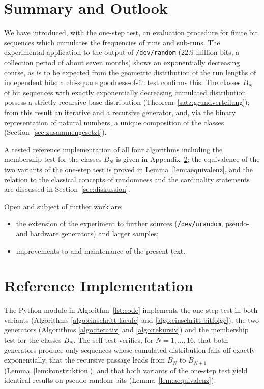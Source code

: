\documentclass[11pt,a4paper]{scrartcl}
\theoremstyle{plain}
\theoremstyle{definition}
\theoremstyle{remark}
\begin{document}
\section{Summary and Outlook}\label{sec:schluss}

We have introduced, with the one-step test, an evaluation procedure
for finite bit sequences which cumulates the frequencies of runs and
sub-runs. The experimental application to the output of
\texttt{/dev/random} ($22.9$ million bits, a collection period of
about seven months) shows an exponentially decreasing course, as is
to be expected from the geometric distribution of the run lengths of
independent bits; a chi-square goodness-of-fit test confirms this.
The classes $B_N$ of bit sequences with exactly exponentially
decreasing cumulated distribution possess a strictly recursive base
distribution (Theorem~\ref{satz:grundverteilung}); from this result
an iterative and a recursive generator, and, via the binary
representation of natural numbers, a unique composition of the
classes (Section~\ref{sec:zusammengesetzt}).

A tested reference implementation of all four algorithms including
the membership test for the classes $B_N$ is given in
Appendix~\ref{sec:code}; the equivalence of the two variants of the
one-step test is proved in Lemma~\ref{lem:aequivalenz}, and the
relation to the classical concepts of randomness and the cardinality
statements are discussed in Section~\ref{sec:diskussion}.

Open and subject of further work are:
\begin{itemize}
  \item the extension of the experiment to further sources
        (\texttt{/dev/urandom}, pseudo- and hardware generators) and
        larger samples;
  \item improvements to and maintenance of the present text.
\end{itemize}

\appendix
\section{Reference Implementation}\label{sec:code}

The Python module in Algorithm~\ref{lst:code} implements the
one-step test in both variants (Algorithms
\ref{algo:einschritt-laeufe} and \ref{algo:einschritt-bitfolge}), the
two generators (Algorithms \ref{algo:iterativ} and
\ref{algo:rekursiv}) and the membership test for the classes $B_N$.
The self-test verifies, for $N=1,\dots,16$, that both generators
produce only sequences whose cumulated distribution falls off exactly
exponentially, that the recursive passage leads from $B_N$ to
$B_{N+1}$ (Lemma~\ref{lem:konstruktion}), and that both variants of
the one-step test yield identical results on pseudo-random bits
(Lemma~\ref{lem:aequivalenz}).
\end{document}
